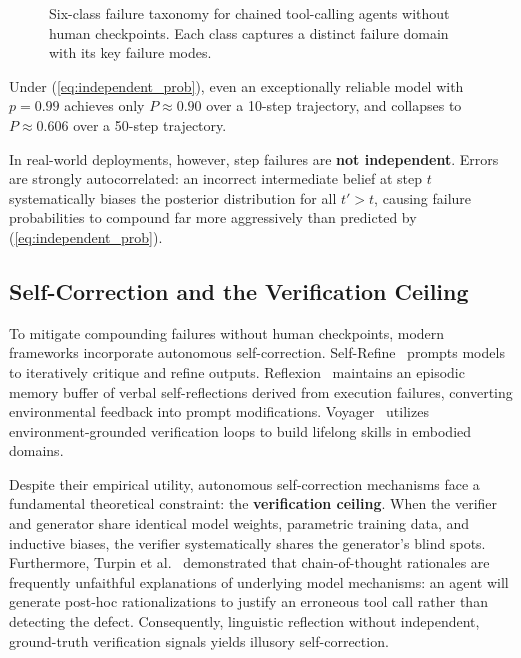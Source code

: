 \documentclass[conference]{IEEEtran}
\begin{document}
\begin{figure}[t]
\caption{Six-class failure taxonomy for chained tool-calling agents without human
checkpoints. Each class captures a distinct failure domain with its key failure modes.}
\label{fig:taxonomy_tree}
\end{figure}

Under (\ref{eq:independent_prob}), even an exceptionally reliable model with $p = 0.99$ achieves only $P \approx 0.90$ over a 10-step trajectory, and collapses to $P \approx 0.606$ over a 50-step trajectory. 

In real-world deployments, however, step failures are \textbf{not independent}. Errors are strongly autocorrelated: an incorrect intermediate belief at step $t$ systematically biases the posterior distribution for all $t' > t$, causing failure probabilities to compound far more aggressively than predicted by (\ref{eq:independent_prob}).

\subsection{Self-Correction and the Verification Ceiling}
To mitigate compounding failures without human checkpoints, modern frameworks incorporate autonomous self-correction. Self-Refine~\cite{madaan2023selfrefine} prompts models to iteratively critique and refine outputs. Reflexion~\cite{shinn2023reflexion} maintains an episodic memory buffer of verbal self-reflections derived from execution failures, converting environmental feedback into prompt modifications. Voyager~\cite{wang2023voyager} utilizes environment-grounded verification loops to build lifelong skills in embodied domains.

Despite their empirical utility, autonomous self-correction mechanisms face a fundamental theoretical constraint: the \textbf{verification ceiling}. When the verifier and generator share identical model weights, parametric training data, and inductive biases, the verifier systematically shares the generator's blind spots. Furthermore, Turpin et al.~\cite{turpin2023unfaithful} demonstrated that chain-of-thought rationales are frequently unfaithful explanations of underlying model mechanisms: an agent will generate post-hoc rationalizations to justify an erroneous tool call rather than detecting the defect. Consequently, linguistic reflection without independent, ground-truth verification signals yields illusory self-correction.
\end{document}
